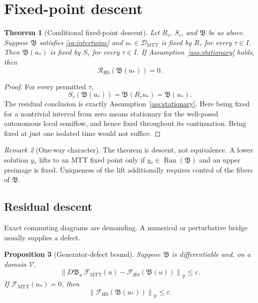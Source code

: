 \documentclass[11pt]{article}
\newtheorem{theorem}{Theorem}[section]
\newtheorem{proposition}[theorem]{Proposition}
\theoremstyle{definition}
\theoremstyle{remark}
\newtheorem{remark}[theorem]{Remark}
\newcommand{\cD}{\mathcal D}
\newcommand{\cF}{\mathcal F}
\newcommand{\cR}{\mathcal R}
\newcommand{\cV}{\mathcal V}
\newcommand{\cY}{\mathcal Y}
\newcommand{\Ran}{\operatorname{Ran}}
\begin{document}
\section{Fixed-point descent}
\label{sec:descent}

\begin{theorem}[Conditional fixed-point descent]
\label{thm:descent}
Let \(R_\tau\), \(S_\tau\), and \(\mathfrak B\) be as above.  Suppose
\(\mathfrak B\) satisfies \cref{eq:intertwine} and
\(u_\ast\in\cD_{\mathrm{MTT}}\) is fixed by \(R_\tau\) for every
\(\tau\in I\).  Then \(\mathfrak B(u_\ast)\) is fixed by \(S_\tau\) for every
\(\tau\in I\).  If Assumption~\ref{ass:stationary} holds, then
\[
\cR_{\mathrm{HS}}(\mathfrak B(u_\ast))=0.
\]
\end{theorem}

\begin{proof}
For every permitted \(\tau\),
\[
S_\tau(\mathfrak B(u_\ast))
=\mathfrak B(R_\tau u_\ast)
=\mathfrak B(u_\ast).
\]
The residual conclusion is exactly Assumption~\ref{ass:stationary}.
Here being fixed for a nontrivial interval from zero means stationary for the
well-posed autonomous local semiflow, and hence fixed throughout its
continuation.  Being fixed at just one isolated time would not suffice.
\end{proof}

\begin{remark}[One-way character]
The theorem is descent, not equivalence.  A lower solution \(y_\ast\) lifts to
an MTT fixed point only if \(y_\ast\in\Ran(\mathfrak B)\) and an upper
preimage is fixed.  Uniqueness of the lift additionally requires control of
the fibers of \(\mathfrak B\).
\end{remark}

\subsection{Residual descent}

Exact commuting diagrams are demanding.  A numerical or perturbative bridge
usually supplies a defect.

\begin{proposition}[Generator-defect bound]
\label{prop:defect}
Suppose \(\mathfrak B\) is differentiable and, on a domain \(\cV\),
\[
\left\|
D\mathfrak B_u\,\cF_{\mathrm{MTT}}(u)
-\cF_{\mathrm{HS}}(\mathfrak B(u))
\right\|_{\cY}
\le \varepsilon .
\]
If \(\cF_{\mathrm{MTT}}(u_\ast)=0\), then
\[
\left\|\cF_{\mathrm{HS}}(\mathfrak B(u_\ast))\right\|_{\cY}
\le\varepsilon .
\]
\end{proposition}
\end{document}
